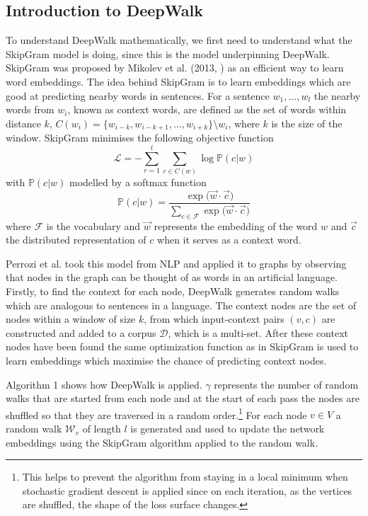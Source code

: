 \documentclass[a4paper]{article}
\renewcommand{\P}{\mathbb P}
\newcommand{\D}{\mathcal D}
\begin{document}
\subsection{Introduction to DeepWalk}
To understand DeepWalk mathematically, we first need to understand what the SkipGram
model is doing, since this is the model underpinning DeepWalk. SkipGram was
proposed by Mikolev et al. (2013, \cite{mikolov2013efficient}) as an efficient way to
learn word embeddings. The idea behind SkipGram is to learn embeddings which are good at
predicting nearby words in sentences. For a sentence $w_1, ... , w_l$ the
nearby words from $w_i$, known as context words, are defined as the set of words
within distance $k$, $C(w_i) = \{w_{i-k}, w_{i-k+1}, \dots , w_{i+k}\} \setminus w_i$, where $k$ is the size of the window. SkipGram
minimises the following objective function
\[\mathcal{L} = - \sum_{r = 1}^{l} \sum_{c \in C(w)} \log{\P(c | w)}\]
with $\P(c | w)$ modelled by a softmax function
\[\P(c|w) = \frac{\exp{(\vec{w} \cdot \vec{c}})}{\sum_{c \in \mathcal{F}}\exp{(\vec{w} \cdot
    \vec{c}})}\]
where $\mathcal{F}$ is the vocabulary and $\vec{w}$ represents the
embedding of the word $w$ and $\vec{c}$ the distributed representation of $c$ when it serves as a
context word.

Perrozi et al. took this model from NLP and applied it to graphs by observing
that nodes in the graph can be thought of as words in an artificial language.
Firstly, to find the context for each node, DeepWalk generates random walks
which are analogous to sentences in a language. The context nodes are the set of
nodes within a window of size $k$, from which input-context pairs $(v, c)$ are
constructed and added to a corpus $\D$, which is a multi-set. After these context nodes have been
found the same optimization function as in SkipGram is used to learn embeddings which maximise
the chance of predicting context nodes.

Algorithm 1 shows how DeepWalk is applied. $\gamma$ represents the number of
random walks that are started from each node and at the start of each pass the
nodes are shuffled so that they are traversed in a random order.\footnote{This
  helps to prevent the algorithm from staying in a local minimum when stochastic
  gradient descent is applied since on each iteration, as the vertices
  are shuffled, the shape of the loss surface changes.} For each node
$v \in V$ a random walk $\mathcal{W}_v$ of length $l$ is generated and used to
update the network embeddings using the SkipGram algorithm applied to the random
walk.
\end{document}
